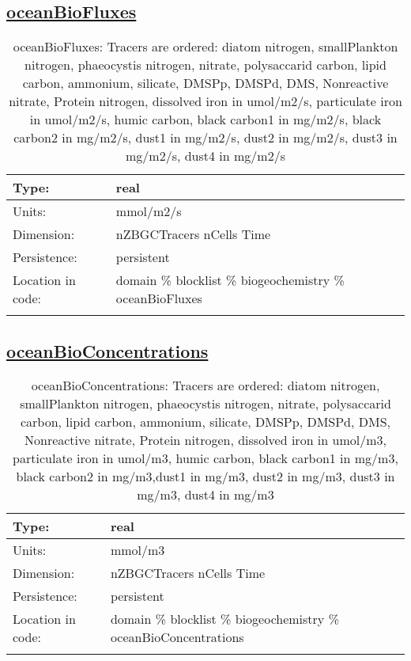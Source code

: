 \subsection[oceanBioFluxes]{\hyperref[sec:var_tab_biogeochemistry]{oceanBioFluxes}}
\label{subsec:var_sec_biogeochemistry_oceanBioFluxes}
\begin{center}
\begin{longtable}{| p{2.0in} | p{4.0in} |}
        \hline 
        Type: & real \\
        \hline 
        Units: & \si{mmol/m2/s} \\
        \hline 
        Dimension: & nZBGCTracers nCells Time \\
        \hline 
        Persistence: & persistent \\
        \hline 
         Location in code: & domain \% blocklist \% biogeochemistry \% oceanBioFluxes \\
         \hline 
    \caption{oceanBioFluxes: Tracers are ordered: diatom nitrogen, smallPlankton nitrogen, phaeocystis nitrogen, nitrate, polysaccarid carbon, lipid carbon, ammonium, silicate, DMSPp, DMSPd, DMS, Nonreactive nitrate, Protein nitrogen, dissolved iron in umol/m2/s, particulate iron in umol/m2/s, humic carbon, black carbon1 in mg/m2/s, black carbon2 in mg/m2/s, dust1 in mg/m2/s, dust2 in mg/m2/s, dust3 in mg/m2/s, dust4 in mg/m2/s}
\end{longtable}
\end{center}
\subsection[oceanBioConcentrations]{\hyperref[sec:var_tab_biogeochemistry]{oceanBioConcentrations}}
\label{subsec:var_sec_biogeochemistry_oceanBioConcentrations}
\begin{center}
\begin{longtable}{| p{2.0in} | p{4.0in} |}
        \hline 
        Type: & real \\
        \hline 
        Units: & \si{mmol/m3} \\
        \hline 
        Dimension: & nZBGCTracers nCells Time \\
        \hline 
        Persistence: & persistent \\
        \hline 
         Location in code: & domain \% blocklist \% biogeochemistry \% oceanBioConcentrations \\
         \hline 
    \caption{oceanBioConcentrations: Tracers are ordered: diatom nitrogen, smallPlankton nitrogen, phaeocystis nitrogen, nitrate, polysaccarid carbon, lipid carbon, ammonium, silicate, DMSPp, DMSPd, DMS, Nonreactive nitrate, Protein nitrogen, dissolved iron in umol/m3, particulate iron in umol/m3, humic carbon, black carbon1 in mg/m3, black carbon2 in mg/m3,dust1 in mg/m3, dust2 in mg/m3, dust3 in mg/m3, dust4 in mg/m3}
\end{longtable}
\end{center}
